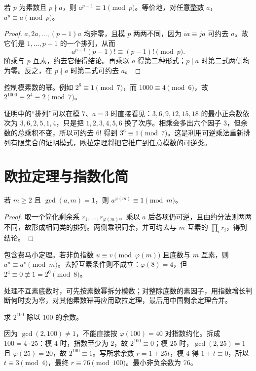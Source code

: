 \documentclass[UTF8,12pt,a4paper,fontset=fandol]{ctexbook}
\begin{document}
\begin{theorem}[费马小定理]
\label{thm:fermat}
若 $p$ 为素数且 $p\nmid a$，则 $a^{p-1}\equiv1\pmod p$。等价地，对任意整数 $a$，$a^p\equiv a\pmod p$。
\end{theorem}
\begin{proof}
$a,2a,\ldots,(p-1)a$ 均非零，且模 $p$ 两两不同，因为 $ia\equiv ja$ 可约去 $a$。故它们是 $1,\ldots,p-1$ 的一个排列，从而
\[
 a^{p-1}(p-1)!\equiv(p-1)!\pmod p.
\]
阶乘与 $p$ 互素，约去它便得结论。再乘以 $a$ 得第二种形式；$p\mid a$ 时第二式两侧均为零。反之，在 $p\nmid a$ 时第二式可约去 $a$。
\end{proof}

控制模素数的幂。例如 $2^6\equiv1\pmod7$，而 $1000\equiv4\pmod6$，故 $2^{1000}\equiv2^4\equiv2\pmod7$。

证明中的“排列”可以在模 $7$、$a=3$ 时直接看见：$3,6,9,12,15,18$ 的最小正余数依次为 $3,6,2,5,1,4$，只是把 $1,2,3,4,5,6$ 换了次序。相乘会多出六个因子 $3$，但余数的总乘积不变，所以可约去 $6!$ 得到 $3^6\equiv1\pmod7$。这是利用可逆乘法重新排列有限集合的证明模式，欧拉定理将把它推广到任意模数的可逆类。

\section{欧拉定理与指数化简}

\begin{theorem}[欧拉定理]
\label{thm:euler}
若 $m\ge2$ 且 $\gcd(a,m)=1$，则 $a^{\varphi(m)}\equiv1\pmod m$。
\end{theorem}
\begin{proof}
取一个简化剩余系 $r_1,\ldots,r_{\varphi(m)}$。乘以 $a$ 后各项仍可逆，且由约分法则两两不同，故形成相同类的排列。两侧乘积同余，并可约去与 $m$ 互素的 $\prod_i r_i$，得到结论。
\end{proof}

包含费马小定理。若非负指数 $u\equiv v\pmod{\varphi(m)}$ 且底数与 $m$ 互素，则 $a^u\equiv a^v\pmod m$。去掉互素条件则不成立：$\varphi(8)=4$，但 $2^4\equiv0\not\equiv1=2^0\pmod8$。

处理不互素底数时，可先按素数幂拆分模数；对整除底数的素因子，用指数增长判断何时变为零，对其他素数幂再应用欧拉定理，最后用中国剩余定理合并。

\begin{example}[底数与模数不互素时的幂运算]
求 $2^{100}$ 除以 $100$ 的余数。
\end{example}
\begin{solve}
因为 $\gcd(2,100)\ne1$，不能直接按 $\varphi(100)=40$ 对指数约化。拆成 $100=4\cdot25$：模 $4$ 时，指数至少为 $2$，故 $2^{100}\equiv0$；模 $25$ 时，$\gcd(2,25)=1$ 且 $\varphi(25)=20$，故 $2^{100}\equiv1$。写所求余数 $r=1+25t$，模 $4$ 得 $1+t\equiv0$，所以 $t\equiv3\pmod4$，最终 $r\equiv76\pmod{100}$。最小非负余数为 $76$。
\end{solve}
\end{document}
